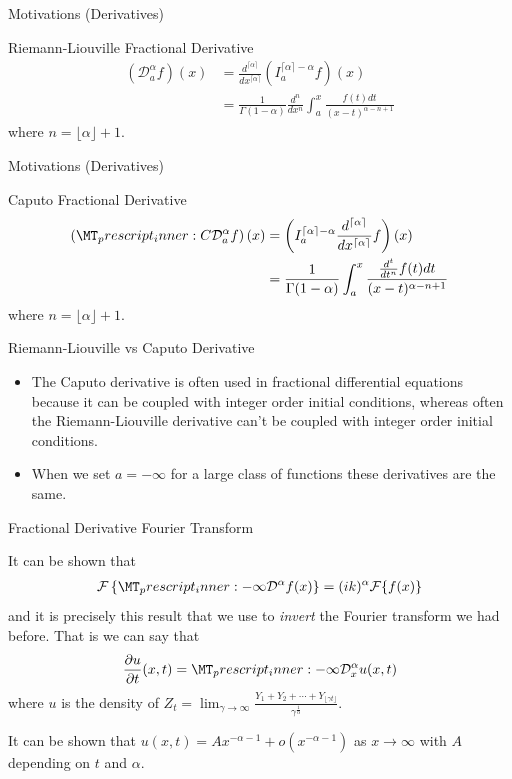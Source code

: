 \documentclass[pdf]{beamer}
\newcommand{\lra}{\longrightarrow}
\newcommand{\rld}[3]{ \left( \mathcal{D}_{#1}^{#2} #3 \right) }
\newcommand{\rli}[3]{ \left( I_{#1}^{#2} #3 \right) }
\newcommand{\capder}[3]{ \left( \prescript{C}{}{\mathcal{D}_{#1}^{#2}} #3 \right) }
\begin{document}
\begin{frame}{Motivations (Derivatives)}
	\begin{block}{Riemann-Liouville Fractional Derivative}
		\begin{align*}
			\rld{a}{\alpha}{f}(x) &= \frac{d^{\lceil \alpha \rceil}}{dx^{\lceil \alpha \rceil}} \rli{a}{\lceil \alpha \rceil - \alpha}{f}(x) \\
				&= \frac{1}{\Gamma(1 - \alpha)}\frac{d^{n}}{dx^n} \int_a^x \frac{f(t)dt}{(x-t)^{\alpha - n + 1}}
		\end{align*}
		where $ n = \lfloor \alpha \rfloor + 1 $.
	\end{block}
\end{frame}

\begin{frame}{Motivations (Derivatives)}
	\begin{block}{Caputo Fractional Derivative}
		\begin{align*}
			\capder{a}{\alpha}{f}(x) &= \rli{a}{\lceil \alpha \rceil - \alpha}{\frac{d^{\lceil \alpha \rceil}}{dx^{\lceil \alpha \rceil}}f}(x) \\
				&= \frac{1}{\Gamma(1 - \alpha)} \int_a^x \frac{\frac{d^{t}}{dt^n}f(t)dt}{(x-t)^{\alpha - n + 1}}
		\end{align*}
		where $ n = \lfloor \alpha \rfloor + 1 $.
	\end{block}
\end{frame}
\begin{frame}{ Riemann-Liouville vs Caputo Derivative}
    \begin{itemize}
	\item The Caputo derivative is often used in fractional differential equations because it
	can be coupled with integer order initial conditions, whereas often the Riemann-Liouville
	derivative can't be coupled with integer order initial conditions.
   
    \item When we set $ a = -\infty $ for a large class of functions these derivatives are the same.
    \end{itemize}
\end{frame}

\begin{frame}{Fractional Derivative Fourier Transform}

	It can be shown that
	\begin{align}
	    \mathcal{F}\left\{\prescript{}{-\infty}{\mathcal{D}^\alpha}f(x) \right\} = (ik)^\alpha \mathcal{F}\{ f(x) \}
    \end{align}
    and it is precisely this result that we use to \emph{invert} the Fourier transform we had before.
    That is we can say that
    \begin{align}
        \frac{\partial u}{\partial t}(x,t) = \prescript{}{-\infty}{\mathcal{D}^\alpha_x} u(x,t)
    \end{align}
    where $u $ is the density of $ Z_t = \lim_{\gamma\lra\infty} \frac{Y_1 + Y_2 + \cdots + Y_{\lfloor \gamma t \rfloor}}{\gamma^\frac{1}{\alpha}} $.
    
    It can be shown that $ u(x,t) = Ax^{-\alpha-1} + o(x^{-\alpha-1}) $ as $ x \lra \infty $ with $ A $ depending on $ t $ and $ \alpha $.
\end{frame}
\end{document}
